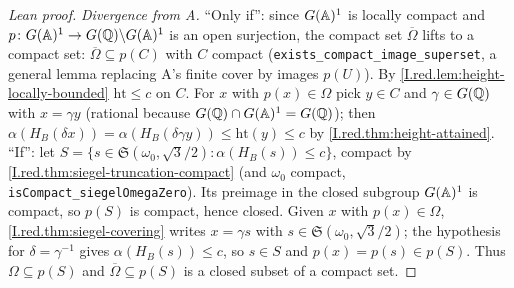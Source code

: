 \begin{proof}[Lean proof]
\emph{Divergence from A.} ``Only if'': since $G(\mathbb{A})^1$ is locally compact and $p\colon G(\mathbb{A})^1\to G(\mathbb{Q})\backslash G(\mathbb{A})^1$ is an open surjection, the compact set $\overline\Omega$ lifts to a compact set: $\overline\Omega\subseteq p(C)$ with $C$ compact (\texttt{exists\_compact\_image\_superset}, a general lemma replacing A's finite cover by images $p(U)$). By \cref{I.red.lem:height-locally-bounded} $\mathrm{ht}\le c$ on $C$. For $x$ with $p(x)\in\Omega$ pick $y\in C$ and $\gamma\in G(\mathbb{Q})$ with $x=\gamma y$ (rational because $G(\mathbb{Q})\cap G(\mathbb{A})^1=G(\mathbb{Q})$); then $\alpha(H_B(\delta x))=\alpha(H_B(\delta\gamma y))\le\mathrm{ht}(y)\le c$ by \cref{I.red.thm:height-attained}. ``If'': let $S=\{s\in\mathfrak S(\omega_0,\sqrt3/2):\alpha(H_B(s))\le c\}$, compact by \cref{I.red.thm:siegel-truncation-compact} (and $\omega_0$ compact, \texttt{isCompact\_siegelOmegaZero}). Its preimage in the closed subgroup $G(\mathbb{A})^1$ is compact, so $p(S)$ is compact, hence closed. Given $x$ with $p(x)\in\Omega$, \cref{I.red.thm:siegel-covering} writes $x=\gamma s$ with $s\in\mathfrak S(\omega_0,\sqrt3/2)$; the hypothesis for $\delta=\gamma^{-1}$ gives $\alpha(H_B(s))\le c$, so $s\in S$ and $p(x)=p(s)\in p(S)$. Thus $\Omega\subseteq p(S)$ and $\overline\Omega\subseteq p(S)$ is a closed subset of a compact set.
\end{proof}
